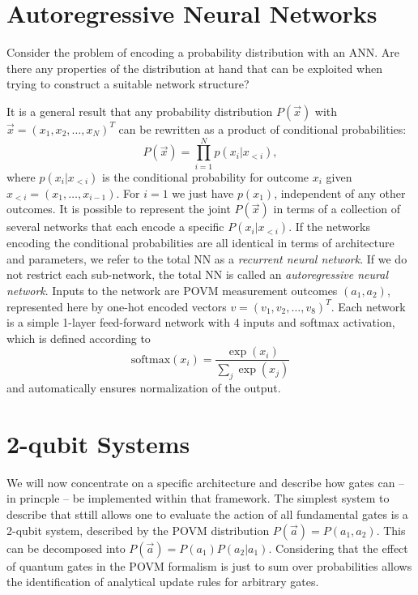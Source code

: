 \documentclass[a4]{article}
\begin{document}
\section{Autoregressive Neural Networks}
Consider the problem of encoding a probability distribution with an ANN. Are
there any properties of the distribution at hand that can be exploited when
trying to construct a suitable network structure? \par
It is a general result that any probability distribution $P(\vec{x})$ with
$\vec{x}=(x_1, x_2, \hdots,x_N)^T$ can be rewritten as a product of conditional
probabilities:
\begin{equation}
    P(\vec{x}) = \prod_{i=1}^N p(x_i | x_{<i}),
\end{equation}
where $p(x_i | x_{<i})$ is the conditional probability for outcome $x_i$ given
$x_{<i} = (x_1, \hdots, x_{i-1})$. For $i=1$ we just have $p(x_1)$, independent
of any other outcomes. It is possible to represent the joint $P(\vec{x})$
in terms of a collection of several networks that each encode a specific $P(x_i
| x_{<i})$. If the networks encoding the conditional probabilities are all
identical in terms of architecture and parameters, we refer to the total NN as a
\textit{recurrent neural network}. If we do not restrict each sub-network, the
total NN is called an \textit{autoregressive neural network}. Inputs to the
network are POVM measurement outcomes $(a_1,a_2)$, represented here by one-hot
encoded vectors $v=(v_1,v_2,\hdots,v_8)^T$. Each network is a simple 1-layer
feed-forward network with 4 inputs and softmax activation, which is defined
according to
\begin{equation}
    \text{softmax}(x_i) = \frac{\exp(x_i)}{\sum_j \exp(x_j)}
\end{equation}
and automatically ensures normalization of the output.
\section{2-qubit Systems}
We will now concentrate on a specific architecture and describe how gates can
-- in princple -- be implemented within that framework. The simplest system to
describe that sttill allows one to evaluate the action of all fundamental gates
is a 2-qubit system, described by the POVM distribution $P(\vec{a})=P(a_1,a_2)$.
This can be decomposed into $P(\vec{a})=P(a_1) P(a_2|a_1)$. Considering that the
effect of quantum gates in the POVM formalism is just to sum over probabilities
allows the identification of analytical update rules for arbitrary gates.
\end{document}
